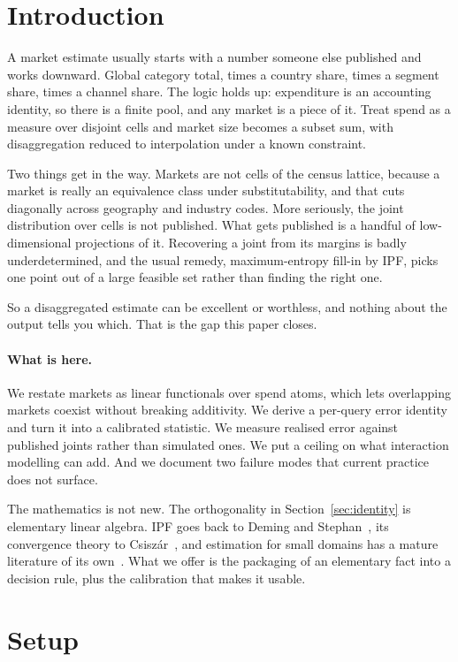 \documentclass[11pt]{article}
\begin{document}
\section{Introduction}

A market estimate usually starts with a number someone else published and works
downward. Global category total, times a country share, times a segment share,
times a channel share. The logic holds up: expenditure is an accounting
identity, so there is a finite pool, and any market is a piece of it. Treat spend
as a measure over disjoint cells and market size becomes a subset sum, with
disaggregation reduced to interpolation under a known constraint.

Two things get in the way. Markets are not cells of the census lattice, because a
market is really an equivalence class under substitutability, and that cuts
diagonally across geography and industry codes. More seriously, the joint
distribution over cells is not published. What gets published is a handful of
low-dimensional projections of it. Recovering a joint from its margins is badly
underdetermined, and the usual remedy, maximum-entropy fill-in by IPF, picks one
point out of a large feasible set rather than finding the right one.

So a disaggregated estimate can be excellent or worthless, and nothing about the
output tells you which. That is the gap this paper closes.

\paragraph{What is here.} We restate markets as linear functionals over spend
atoms, which lets overlapping markets coexist without breaking additivity. We
derive a per-query error identity and turn it into a calibrated statistic. We
measure realised error against published joints rather than simulated ones. We
put a ceiling on what interaction modelling can add. And we document two failure
modes that current practice does not surface.

The mathematics is not new. The orthogonality in Section~\ref{sec:identity} is
elementary linear algebra. IPF goes back to Deming and Stephan~\cite{deming1940},
its convergence theory to Csisz\'ar~\cite{csiszar1975}, and estimation for small
domains has a mature literature of its own~\cite{rao2015}. What we offer is the
packaging of an elementary fact into a decision rule, plus the calibration that
makes it usable.

\section{Setup}
\end{document}
